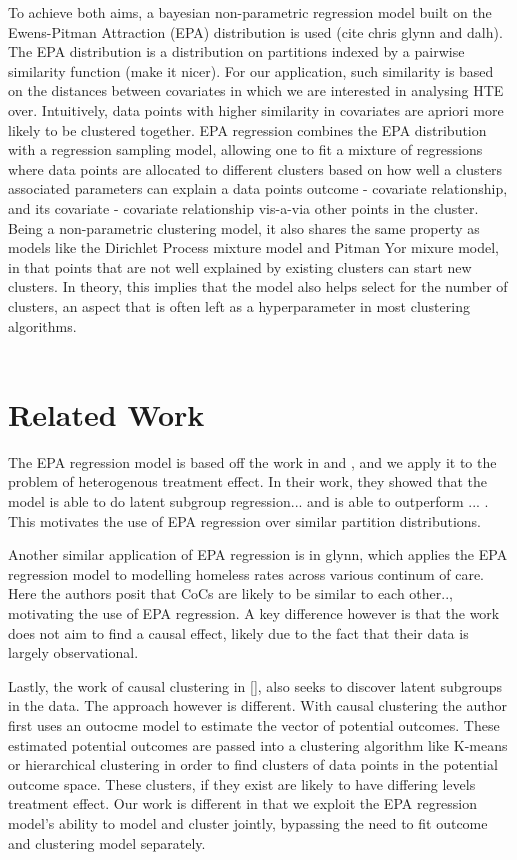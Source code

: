 \documentclass{article}
\begin{document}
To achieve both aims, a bayesian non-parametric regression model built on the Ewens-Pitman Attraction (EPA) distribution is used (cite chris glynn and dalh). The EPA distribution is a distribution on partitions indexed by a pairwise similarity function (make it nicer). For our application, such similarity is based on the distances between covariates in which we are interested in analysing HTE over. Intuitively, data points with higher similarity in covariates are apriori more likely to be clustered together. EPA regression combines the EPA distribution with a regression sampling model, allowing one to fit a mixture of regressions where data points are allocated to different clusters based on how well a clusters associated parameters can explain a data points outcome - covariate relationship, and its covariate - covariate relationship vis-a-via other points in the cluster. Being a non-parametric clustering model, it also shares the same property as models like the Dirichlet Process mixture model and Pitman Yor mixure model, in that points that are not well explained by existing clusters can start new clusters. In theory, this implies that the model also helps select for the number of clusters, an aspect that is often left as a hyperparameter in most clustering algorithms.
\\ \\ 
\section{Related Work}

The EPA regression model is based off the work in \cite{dahl2017random} and \cite{glynn2021inflection}, and we apply it to the problem of heterogenous treatment effect. In their work, they showed that the model is able to do latent subgroup regression... and is able to outperform ... . This motivates the use of EPA regression over similar partition distributions. 

Another similar application of EPA regression is in glynn, which applies the EPA regression model to modelling homeless rates across various continum of care. Here the authors posit that CoCs are likely to be similar to each other.., motivating the use of EPA regression. A key difference however is that the work does not aim to find a causal effect, likely due to the fact that their data is largely observational. 

Lastly, the work of causal clustering in [], also seeks to discover latent subgroups in the data. The approach however is different. With causal clustering the author first uses an outocme model to estimate the vector of potential outcomes. These estimated potential outcomes are passed into a clustering algorithm like K-means or hierarchical clustering in order to find clusters of data points in the potential outcome space. These clusters, if they exist are likely to have differing levels treatment effect. Our work is different in that we exploit the EPA regression model's ability to model and cluster jointly, bypassing the need to fit outcome and clustering model separately. 
\end{document}
